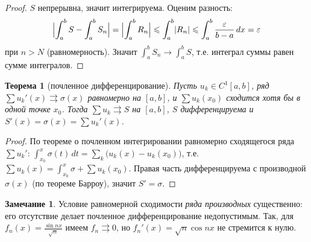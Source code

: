 \documentclass[11pt,a4paper]{article}
\theoremstyle{definition}
\newtheorem{remark}[definition]{Замечание}
\theoremstyle{plain}
\newtheorem{theorem}[definition]{Теорема}
\newcommand{\dx}{\,dx}
\newcommand{\dt}{\,dt}
\newcommand{\eps}{\varepsilon}
\renewcommand{\le}{\leqslant}
\DeclarePairedDelimiter{\abs}{\lvert}{\rvert}
\begin{document}
\begin{proof}
$S$ непрерывна, значит интегрируема. Оценим разность:
\[
  \abs[\Big]{\int_a^b S-\int_a^b S_n}=\abs[\Big]{\int_a^b R_n}\le\int_a^b\abs{R_n}
   \le\int_a^b\frac{\eps}{b-a}\dx=\eps
\]
при $n>N$ (равномерность). Значит $\int_a^b S_n\to\int_a^b S$, т.е. интеграл суммы равен сумме
интегралов.
\end{proof}

\begin{theorem}[почленное дифференцирование]
Пусть $u_k\in C^1[a,b]$, ряд $\sum u_k'(x)\rightrightarrows\sigma(x)$ равномерно на $[a,b]$, и
$\sum u_k(x_0)$ сходится хотя бы в одной точке $x_0$. Тогда $\sum u_k\rightrightarrows S$ на
$[a,b]$, $S$ дифференцируема и $S'(x)=\sigma(x)=\sum u_k'(x)$.
\end{theorem}

\begin{proof}
По теореме о почленном интегрировании равномерно сходящегося ряда $\sum u_k'$:
$\int_{x_0}^x\sigma(t)\dt=\sum_k\bigl(u_k(x)-u_k(x_0)\bigr)$, т.е.
$\sum u_k(x)=\int_{x_0}^x\sigma+\sum u_k(x_0)$. Правая часть дифференцируема с производной
$\sigma(x)$ (по теореме Барроу), значит $S'=\sigma$.
\end{proof}

\begin{remark}
Условие равномерной сходимости \emph{ряда производных} существенно: его отсутствие делает
почленное дифференцирование недопустимым. Так, для $f_n(x)=\tfrac{\sin nx}{\sqrt n}$ имеем
$f_n\rightrightarrows0$, но $f_n'(x)=\sqrt n\cos nx$ не стремится к нулю.
\end{remark}
\end{document}
